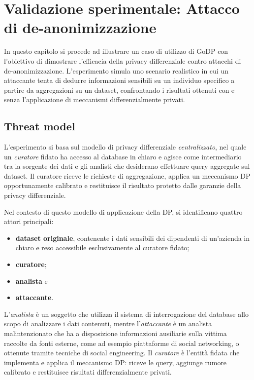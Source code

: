 \chapter[Attacco di de-anonimizzazione]{Validazione sperimentale: Attacco di de-anonimizzazione}

In questo capitolo si procede ad illustrare un caso di utilizzo di GoDP con l'obiettivo di dimostrare l'efficacia della privacy differenziale contro attacchi di de-anonimizzazione. L'esperimento simula uno scenario realistico in cui un attaccante tenta di dedurre informazioni sensibili su un individuo specifico a partire da aggregazioni su un dataset, confrontando i risultati ottenuti con e senza l'applicazione di meccanismi differenzialmente privati.

\section{Threat model}

L'esperimento si basa sul modello di privacy differenziale \textit{centralizzato}, nel quale un \textit{curatore} fidato ha accesso al database in chiaro e agisce come intermediario tra la sorgente dei dati e gli analisti che desiderano effettuare query aggregate sul dataset. Il curatore riceve le richieste di aggregazione, applica un meccanismo DP opportunamente calibrato e restituisce il risultato protetto dalle garanzie della privacy differenziale.

Nel contesto di questo modello di applicazione della DP, si identificano quattro attori principali:
\begin{itemize}
    \item \textbf{dataset originale}, contenente i dati sensibili dei dipendenti di un'azienda in chiaro e reso accessibile esclusivamente al curatore fidato;
    \item \textbf{curatore};
    \item \textbf{analista} e
    \item \textbf{attaccante}.
\end{itemize}

L'\textit{analista} è un soggetto che utilizza il sistema di interrogazione del database allo scopo di analizzare i dati contenuti, mentre l'\textit{attaccante} è un analista malintenzionato che ha a disposizione informazioni ausiliarie sulla vittima raccolte da fonti esterne, come ad esempio piattaforme di social networking, o ottenute tramite tecniche di social engineering. Il \textit{curatore} è l'entità fidata che implementa e applica il meccanismo DP: riceve le query, aggiunge rumore calibrato e restituisce risultati differenzialmente privati.


